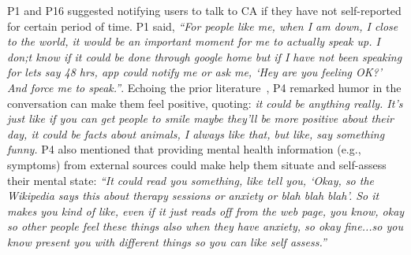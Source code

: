         P1 and P16 suggested notifying users to talk to \ac{CA} if they have not self-reported for certain period of time.
        P1 said,
        \textit{``For people like me, when I am down, I close to the world, it would be an important moment for me to actually speak up. I don;t know if it could be done through google home but if I have not been speaking for lets say 48 hrs, \acl{app} could notify me or ask me, `Hey are you feeling OK?' And force me to speak.''}.
        Echoing the prior literature~\cite{clark2019makes}, P4 remarked humor in the conversation can make them feel positive, quoting:
		\textit{it could be anything really. It's just like if you can get people to smile maybe they'll be more positive about their day, it could be facts about animals, I always like that, but like, say something funny.}
        P4 also mentioned that providing mental health information (e.g., symptoms) from external sources could make help them situate and self-assess their mental state:
        \textit{``It could read you something, like tell you, `Okay, so the Wikipedia says this about therapy sessions or anxiety or blah blah blah'. So it makes you kind of like, even if it just reads off from the web page, you know, okay so other people feel these things also when they have anxiety, so okay fine...so you know present you with different things so you can like self assess.'' }
        
        
    
    